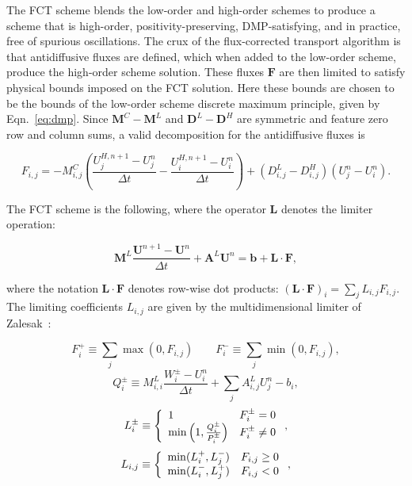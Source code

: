 The FCT scheme blends the low-order and high-order schemes
to produce a scheme
that is high-order, positivity-preserving, DMP-satisfying,
and in practice, free of spurious oscillations.
The crux of the flux-corrected transport algorithm is that
antidiffusive fluxes are defined, which when added to the
low-order scheme, produce the high-order scheme solution.
These fluxes $\mathbf{F}$ are then limited to satisfy
physical bounds imposed on the FCT solution.
Here these bounds
are chosen to be the bounds of the low-order scheme discrete
maximum principle, given by Eqn.~\ref{eq:dmp}.
Since $\mathbf{M}^C-\mathbf{M}^L$ and $\mathbf{D}^L-\mathbf{D}^H$ are symmetric
and feature zero row and column sums, a valid decomposition for
the antidiffusive fluxes is

\begin{equation}
   F_{i,j} = -M_{i,j}^C\left(\frac{U^{H,n+1}_j-U^n_j}{\Delta t}
   - \frac{U^{H,n+1}_i-U^n_i}{\Delta t}\right)
   + (D_{i,j}^L-D_{i,j}^H)(U^n_j - U^n_i).
\end{equation}

The FCT scheme is the following, where the operator
$\mathbf{L}$ denotes the limiter operation:

\begin{equation}\label{eq:FCTscheme}
   \mathbf{M}^L\frac{\mathbf{U}^{n+1}-\mathbf{U}^n}{\Delta t}
      + \mathbf{A}^L\mathbf{U}^n
      = \mathbf{b} + \mathbf{L}\cdot\mathbf{F},
\end{equation}

where the notation $\mathbf{L}\cdot\mathbf{F}$ denotes row-wise dot products:
$(\mathbf{L}\cdot\mathbf{F})_i = \sum_j L_{i,j}F_{i,j}$.
The limiting coefficients $L_{i,j}$ are given by the multidimensional
limiter of Zalesak~\cite{zalesak}:

\begin{equation}\label{eq:P_defs}
   F_i^+ \equiv \sum\limits_j\max(0,F_{i,j}) \qquad
   F_i^- \equiv \sum\limits_j\min(0,F_{i,j}),
\end{equation}
\begin{equation}\label{eq:Q_defs}
      Q_i^\pm \equiv M_{i,i}^L\frac{W_i^\pm-U_i^n}{\Delta t}
      + \sum\limits_j A_{i,j}^L U_j^n - b_i,
\end{equation}
\begin{equation}\label{eq:R_defs}
   L_i^\pm \equiv\left\{
      \begin{array}{l l}
         1                                          & F_i^\pm = 0\\
         \min\left(1,\frac{Q_i^\pm}{P_i^\pm}\right) & F_i^\pm \ne 0
      \end{array}
      \right.,
\end{equation}
\begin{equation}\label{eq:L_defs}
   L_{i,j} \equiv\left\{
      \begin{array}{l l}
         \min(L_i^+,L_j^-) & F_{i,j} \geq 0\\
         \min(L_i^-,L_j^+) & F_{i,j} < 0
      \end{array}
      \right.,
\end{equation}

